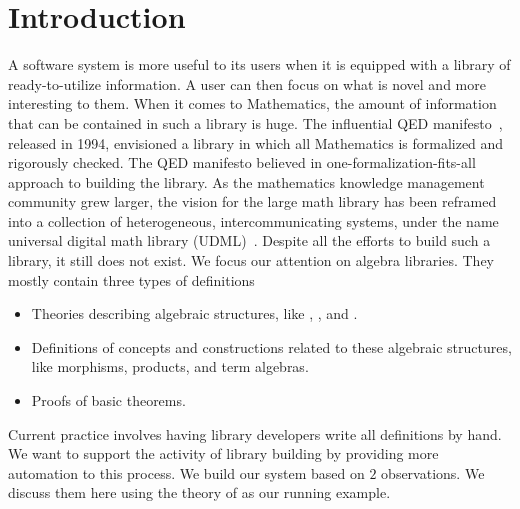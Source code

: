 \chapter{Introduction}



A software system is more useful to its users when it is equipped with a library of ready-to-utilize information. A user can then focus on what is novel and more interesting to them. When it comes to Mathematics, the amount of information that can be contained in such a library is huge. The influential QED manifesto~\cite{boyer1994qed}, released in 1994, envisioned a library in which all Mathematics is formalized and rigorously checked. The QED manifesto believed in one-formalization-fits-all approach to building the library. 
As the mathematics knowledge management community grew larger, the vision for the large math library has been reframed into a collection of heterogeneous, intercommunicating systems, under the name universal digital math library (UDML)~\cite{farmer2004mkm}. Despite all the efforts to build such a library, it still does not exist. We focus our attention on algebra libraries. They mostly contain three types of definitions 
\begin{itemize}
    \item Theories describing algebraic structures, like , , and . 
    \item Definitions of concepts and constructions related to these algebraic structures, like morphisms, products, and term algebras.  
    \item Proofs of basic theorems. 
\end{itemize}

Current practice involves having library developers write all definitions by hand. We want to support the activity of library building by providing more automation to this process. We build our system based on $2$ observations. We discuss them here using the theory of  as our running example.  

